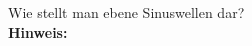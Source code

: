 \begin{question}[section=5,subsection=52,name={Sinuswelle},difficulty=4,type=mdl,tags={}]
	Wie stellt man ebene Sinuswellen dar?
	\\ \textbf{Hinweis:}\\
	
\end{question}
\begin{solution}
	
\end{solution}